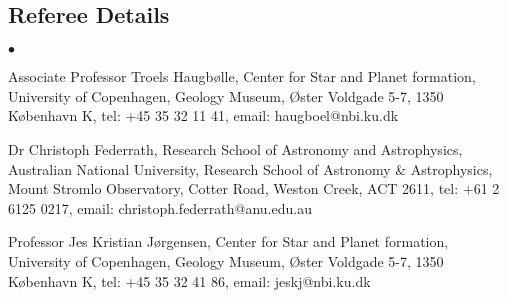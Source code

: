 \documentclass[margin,line]{res}
\newenvironment{list2}{
	\begin{list}{$\bullet$}{%
			\setlength{\itemsep}{0in}
			\setlength{\parsep}{0in} \setlength{\parskip}{0in}
			\setlength{\topsep}{0in} \setlength{\partopsep}{0in} 
			\setlength{\leftmargin}{0.2in}}}{\end{list}}
\begin{document}
\begin{resume}
		\section{\sc Referee Details}
		\begin{list2}
			\item Associate Professor Troels Haugb{\o}lle, Center for Star and Planet formation, University of Copenhagen, Geology Museum, Øster Voldgade 5-7, 1350 København K, tel: +45 35 32 11 41, email: haugboel@nbi.ku.dk
			\item Dr Christoph Federrath, Research School of Astronomy and Astrophysics, Australian National University, Research School of Astronomy \& Astrophysics, Mount Stromlo Observatory, Cotter Road, Weston Creek, ACT 2611, tel: +61 2 6125 0217, email: christoph.federrath@anu.edu.au
			\item Professor Jes Kristian J{\o}rgensen, Center for Star and Planet formation, University of Copenhagen, Geology Museum, Øster Voldgade 5-7, 1350 København K, tel:  +45 35 32 41 86, email: jeskj@nbi.ku.dk
		\end{list2}
	

\end{resume}
\end{document}
